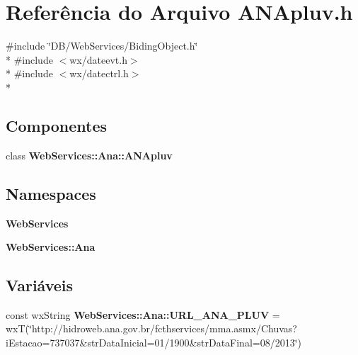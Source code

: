 \section{Referência do Arquivo A\+N\+Apluv.\+h}
\label{_a_n_apluv_8h}
{\ttfamily \#include \char`\"{}D\+B/\+Web\+Services/\+Biding\+Object.\+h\char`\"{}}\\*
{\ttfamily \#include $<$wx/dateevt.\+h$>$}\\*
{\ttfamily \#include $<$wx/datectrl.\+h$>$}\\*
\subsection*{Componentes}
\begin{DoxyCompactItemize}
\item 
class {\bf Web\+Services\+::\+Ana\+::\+A\+N\+Apluv}
\end{DoxyCompactItemize}
\subsection*{Namespaces}
\begin{DoxyCompactItemize}
\item 
 {\bf Web\+Services}
\item 
 {\bf Web\+Services\+::\+Ana}
\end{DoxyCompactItemize}
\subsection*{Variáveis}
\begin{DoxyCompactItemize}
\item 
const wx\+String {\bf Web\+Services\+::\+Ana\+::\+U\+R\+L\+\_\+\+A\+N\+A\+\_\+\+P\+L\+UV} = wxT(\char`\"{}http\+://hidroweb.\+ana.\+gov.\+br/fcthservices/mma.\+asmx/Chuvas?i\+Estacao=737037\&str\+Data\+Inicial=01/1900\&str\+Data\+Final=08/2013\char`\"{})
\end{DoxyCompactItemize}
